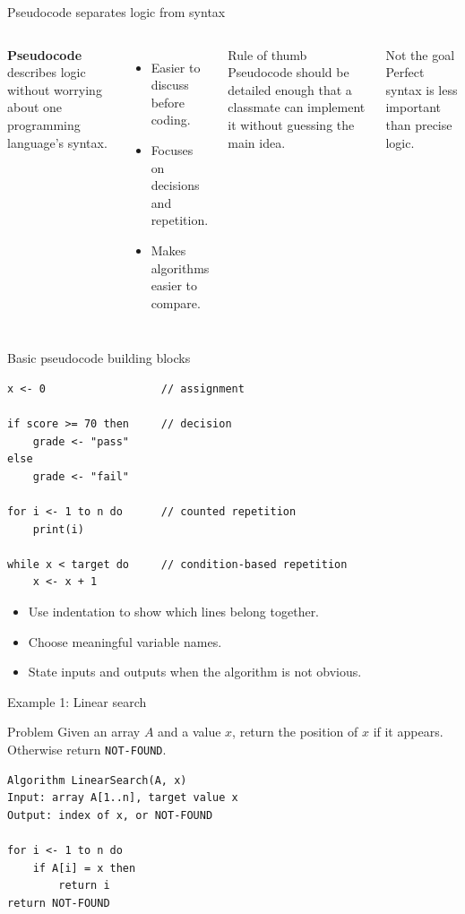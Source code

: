 \documentclass[11pt,aspectratio=43]{beamer}
\begin{document}
\begin{frame}{Pseudocode separates logic from syntax}
\begin{columns}[T]
    \textbf{Pseudocode} describes logic without worrying about one programming language's syntax.
    \vspace{0.8em}
    \begin{itemize}
      \item Easier to discuss before coding.
      \item Focuses on decisions and repetition.
      \item Makes algorithms easier to compare.
    \end{itemize}
    \begin{block}{Rule of thumb}
      Pseudocode should be detailed enough that a classmate can implement it without guessing the main idea.
    \end{block}
    \vspace{0.5em}
    \begin{alertblock}{Not the goal}
      Perfect syntax is less important than precise logic.
    \end{alertblock}
\end{columns}
\end{frame}

\begin{frame}[fragile]{Basic pseudocode building blocks}
\begin{lstlisting}[style=pseudo]
x <- 0                  // assignment

if score >= 70 then     // decision
    grade <- "pass"
else
    grade <- "fail"

for i <- 1 to n do      // counted repetition
    print(i)

while x < target do     // condition-based repetition
    x <- x + 1
\end{lstlisting}

\vspace{-0.4em}
\begin{itemize}
  \item Use indentation to show which lines belong together.
  \item Choose meaningful variable names.
  \item State inputs and outputs when the algorithm is not obvious.
\end{itemize}
\end{frame}

\begin{frame}[fragile]{Example 1: Linear search}
\begin{block}{Problem}
Given an array $A$ and a value $x$, return the position of $x$ if it appears. Otherwise return \texttt{NOT-FOUND}.
\end{block}

\begin{lstlisting}[style=pseudo]
Algorithm LinearSearch(A, x)
Input: array A[1..n], target value x
Output: index of x, or NOT-FOUND

for i <- 1 to n do
    if A[i] = x then
        return i
return NOT-FOUND
\end{lstlisting}
\end{frame}
\end{document}
